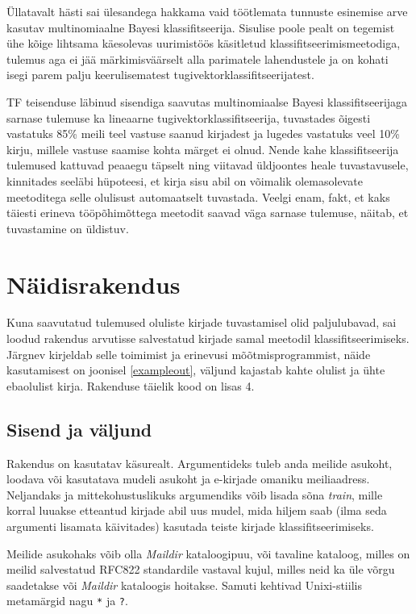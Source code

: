 \documentclass[]{trkuur}
\let\eng\emph
\let\enp\eng
\begin{document}
Üllatavalt hästi sai ülesandega hakkama vaid töötlemata tunnuste esinemise arve
kasutav multinomiaalne Bayesi klassifitseerija. Sisulise poole pealt on tegemist
ühe kõige lihtsama käesolevas uurimistöös käsitletud klassifitseerimismeetodiga,
tulemus aga ei jää märkimisväärselt alla parimatele lahendustele ja on kohati
isegi parem palju keerulisematest tugivektorklassifitseerijatest.

TF teisenduse läbinud sisendiga saavutas multinomiaalse Bayesi klassifitseerijaga
sarnase tulemuse ka lineaarne tugivektorklassifitseerija, tuvastades õigesti
vastatuks 85\% meili teel vastuse saanud kirjadest ja lugedes vastatuks veel 10\%
kirju, millele vastuse saamise kohta märget ei olnud. Nende kahe klassifitseerija
tulemused kattuvad peaaegu täpselt ning viitavad üldjoontes heale tuvastavusele,
kinnitades seeläbi hüpoteesi, et kirja sisu abil on võimalik olemasolevate
meetoditega selle olulisust automaatselt tuvastada. Veelgi enam, fakt,
et kaks täiesti erineva tööpõhimõttega meetodit saavad väga sarnase tulemuse,
näitab, et tuvastamine on üldistuv.


\section{Näidisrakendus}
Kuna saavutatud tulemused oluliste kirjade tuvastamisel olid paljulubavad,
sai loodud rakendus arvutisse salvestatud kirjade samal meetodil
klassifitseerimiseks. Järgnev kirjeldab selle toimimist ja erinevusi mõõtmisprogrammist,
näide kasutamisest on joonisel \ref{exampleout}, väljund kajastab kahte olulist ja ühte ebaolulist kirja.
Rakenduse täielik kood on lisas 4.

\subsection{Sisend ja väljund}
Rakendus on kasutatav käsurealt. Argumentideks tuleb anda meilide asukoht,
loodava või kasutatava mudeli asukoht ja e-kirjade omaniku meiliaadress.
Neljandaks ja mittekohustuslikuks argumendiks
võib lisada sõna \enp{train}, mille korral luuakse etteantud kirjade abil
uus mudel, mida hiljem saab (ilma seda argumenti lisamata käivitades) kasutada
teiste kirjade klassifitseerimiseks.

Meilide asukohaks võib olla \enp{Maildir} kataloogipuu, või tavaline kataloog,
milles on meilid salvestatud RFC822 standardile vastaval kujul, milles neid ka üle võrgu
saadetakse või \enp{Maildir} kataloogis hoitakse.
Samuti kehtivad Unixi-stiilis metamärgid nagu \texttt{*} ja \texttt{?}.
\end{document}
